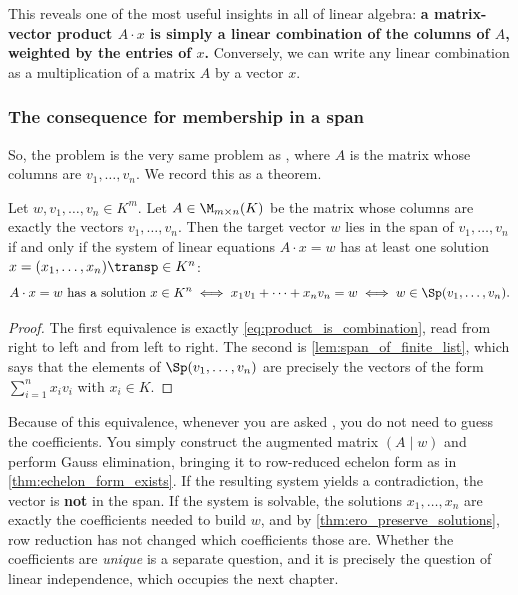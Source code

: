 This reveals one of the most useful insights in all of linear algebra: \textbf{a matrix-vector product $A \cdot x$ is simply a linear combination of the columns of $A$, weighted by the entries of $x$.} Conversely, we can write any linear combination as a multiplication of a matrix $A$ by a vector $x$.

\subsubsection{The consequence for membership in a span}

So, the problem  is the very same problem as , where $A$ is the matrix whose columns are $v_1, \dots, v_n$. We record this as a theorem.

\begin{theorem}
\label{thm:span_iff_consistent}
Let $w, v_1, \dots, v_n \in K^m$. Let $A \in \M_{m \times n}(K)$ be the matrix whose columns are exactly the vectors $v_1, \dots, v_n$. Then the target vector $w$ lies in the span of $v_1, \dots, v_n$ if and only if the system of linear equations $A \cdot x = w$ has at least one solution $x = (x_1, \dots, x_n)\transp \in K^n$:
\[
A \cdot x = w \text{ has a solution } x \in K^n
\iff x_1 v_1 + \dots + x_n v_n = w
\iff w \in \Sp(v_1, \dots, v_n).
\]
\end{theorem}

\begin{proof}
The first equivalence is exactly \eqref{eq:product_is_combination}, read from right to left and from left to right. The second is \cref{lem:span_of_finite_list}, which says that the elements of $\Sp(v_1, \dots, v_n)$ are precisely the vectors of the form $\sum_{i=1}^n x_i v_i$ with $x_i \in K$.
\end{proof}

\begin{remark}
\label{rem:span_check_in_practice}
Because of this equivalence, whenever you are asked , you do not need to guess the coefficients. You simply construct the augmented matrix $(A \mid w)$ and perform Gauss elimination, bringing it to row-reduced echelon form as in \cref{thm:echelon_form_exists}. If the resulting system yields a contradiction, the vector is \textbf{not} in the span. If the system is solvable, the solutions $x_1, \dots, x_n$ are exactly the coefficients needed to build $w$, and by \cref{thm:ero_preserve_solutions}, row reduction has not changed which coefficients those are. Whether the coefficients are \emph{unique} is a separate question, and it is precisely the question of linear independence, which occupies the next chapter.
\end{remark}

